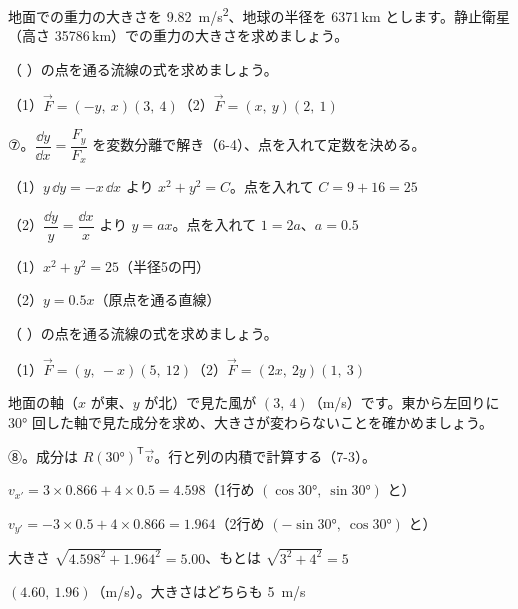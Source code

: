\begin{jibun}
地面での重力の大きさを \qty{9.82}{m/s^2}、地球の半径を \num{6371}\,km とします。静止衛星（高さ \num{35786}\,km）での重力の大きさを求めましょう。
\end{jibun}

\begin{reidai}[流線の式を求める]
（ ）の点を通る流線の式を求めましょう。\par
（1）$\vec F=(-y,\ x)$\quad $(3,\ 4)$\qquad（2）$\vec F=(x,\ y)$\quad $(2,\ 1)$\par
\kangaekata ⑦。$\dfrac{\dd y}{\dd x}=\dfrac{F_y}{F_x}$ を変数分離で解き（6-4）、点を入れて定数を決める。\par
\shiki\kviiifs{}\zw{} （1）$y\,\dd y=-x\,\dd x$ より $x^2+y^2=C$。点を入れて $C=9+16=25$\par
\kviiifa （2）$\dfrac{\dd y}{y}=\dfrac{\dd x}{x}$ より $y=ax$。点を入れて $1=2a$、$a=0.5$\par
\kotae\kviiifs{}\zw{} （1）$x^2+y^2=25$（半径5の円）\par
\kviiifa （2）$y=0.5x$（原点を通る直線）
\end{reidai}

\begin{jibun}
（ ）の点を通る流線の式を求めましょう。\par
（1）$\vec F=(y,\ -x)$\quad $(5,\ 12)$\qquad（2）$\vec F=(2x,\ 2y)$\quad $(1,\ 3)$
\end{jibun}

\begin{reidai}[回した軸で見た成分]
地面の軸（$x$ が東、$y$ が北）で見た風が $(3,\ 4)$（m/s）です。東から左回りに $30°$ 回した軸で見た成分を求め、大きさが変わらないことを確かめましょう。\par
\kangaekata ⑧。成分は $R(30°)^{\mathsf T}\vec v$。行と列の内積で計算する（7-3）。\par
\shiki\kviiifs{}\zw{} $v_{x'}=3\times0.866+4\times0.5=4.598$（1行め $(\cos30°,\ \sin30°)$ と）\par
\kviiifa $v_{y'}=-3\times0.5+4\times0.866=1.964$（2行め $(-\sin30°,\ \cos30°)$ と）\par
\kviiifa 大きさ $\sqrt{4.598^2+1.964^2}=5.00$、もとは $\sqrt{3^2+4^2}=5$\par
\kotae\kviiifs{}\zw{} $(4.60,\ 1.96)$（m/s）。大きさはどちらも \qty{5}{m/s}
\end{reidai}



